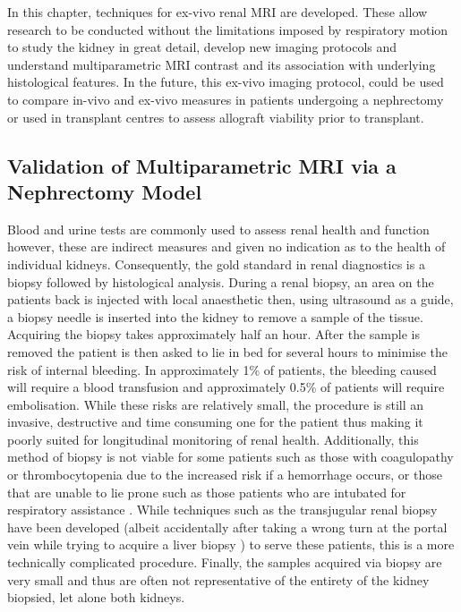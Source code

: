 In this chapter, techniques for ex-vivo renal \ac{MRI} are developed. These allow research to be conducted without the limitations imposed by respiratory motion to study the kidney in great detail, develop new imaging protocols and understand multiparametric \ac{MRI} contrast and its association with underlying histological features. In the future, this ex-vivo imaging protocol, could be used to compare in-vivo and ex-vivo measures in patients undergoing a nephrectomy or used in transplant centres to assess allograft viability prior to transplant.

\subsection{Validation of Multiparametric MRI via a Nephrectomy Model}

Blood and urine tests are commonly used to assess renal health and function however, these are indirect measures and given no indication as to the health of individual kidneys. Consequently, the gold standard in renal diagnostics is a biopsy followed by histological analysis. During a renal biopsy, an area on the patients back is injected with local anaesthetic then, using ultrasound as a guide, a biopsy needle is inserted into the kidney to remove a sample of the tissue. Acquiring the biopsy takes approximately half an hour. After the sample is removed the patient is then asked to lie in bed for several hours to minimise the risk of internal bleeding. In approximately 1\% of patients, the bleeding caused will require a blood transfusion and approximately 0.5\% of patients will require embolisation. While these risks are relatively small, the procedure is still an invasive, destructive and time consuming one for the patient thus making it poorly suited for longitudinal monitoring of renal health. Additionally, this method of biopsy is not viable for some patients such as those with coagulopathy or thrombocytopenia due to the increased risk if a hemorrhage occurs, or those that are unable to lie prone such as those patients who are intubated for respiratory assistance \cite{rathod_safety_2017}. While techniques such as the transjugular renal biopsy have been developed (albeit accidentally after taking a wrong turn at the portal vein while trying to acquire a liver biopsy \cite{mal_transjugular_1990}) to serve these patients, this is a more technically complicated procedure. Finally, the samples acquired via biopsy are very small and thus are often not representative of the entirety of the kidney biopsied, let alone both kidneys.

